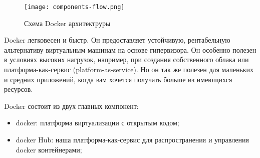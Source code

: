 \begin{figure}[h!]
\centering
	\texttt{[image: components-flow.png]}
	\caption{Схема Docker архитектруры}
\end{figure}
\clearpage

Docker легковесен и быстр. Он предоставляет устойчивую, рентабельную альтернативу виртуальным машинам на основе гипервизора. Он особенно полезен в условиях высоких нагрузок, например, при создания собственного облака или платформа-как-сервис (platform-as-service). Но он так же полезен для маленьких и средних приложений, когда вам хочется получать больше из имеющихся ресурсов.

Docker состоит из двух главных компонент:

\begin{itemize}
  \item docker: платформа виртуализации с открытым кодом;
  \item docker Hub: наша платформа-как-сервис для распространения и управления docker контейнерами;
\end{itemize}
